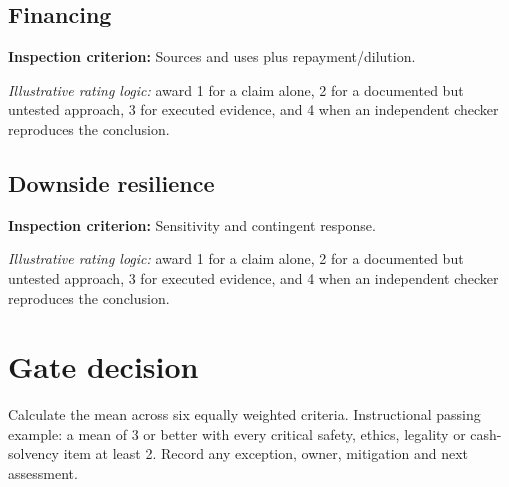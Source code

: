 \documentclass[11pt]{article}
\begin{document}
\subsection*{Financing}
\textbf{Inspection criterion:} Sources and uses plus repayment/dilution.\par\textit{Illustrative rating logic:} award 1 for a claim alone, 2 for a documented but untested approach, 3 for executed evidence, and 4 when an independent checker reproduces the conclusion.\par
\subsection*{Downside resilience}
\textbf{Inspection criterion:} Sensitivity and contingent response.\par\textit{Illustrative rating logic:} award 1 for a claim alone, 2 for a documented but untested approach, 3 for executed evidence, and 4 when an independent checker reproduces the conclusion.\par
\section{Gate decision}
Calculate the mean across six equally weighted criteria. Instructional passing example: a mean of 3 or better with every critical safety, ethics, legality or cash-solvency item at least 2. Record any exception, owner, mitigation and next assessment.
\end{document}
